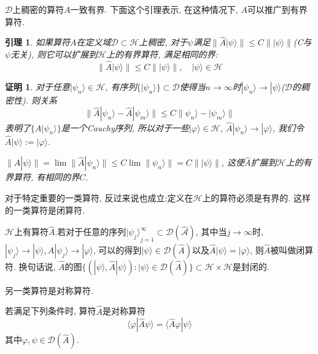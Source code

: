 \documentclass[a4paper,11pt]{article}
\theoremstyle{mystyle}
\newtheorem{lemma}{\hspace{2em}引理}[section]
\newtheorem{Proof}{\hspace{2em}证明}[section]
\begin{document}
$\mathcal{D}$上稠密的算符$A$一致有界. 下面这个引理表示, 在这种情况下, $A$可以推广到有界算符.
\begin{lemma}
  如果算符$A$在定义域$\mathcal{D}\subset\mathcal{H}$上稠密, 对于$\psi$满足$\|\hat{A}|\psi\rangle\|\leq C\||\psi\rangle\|$(C与$\psi$无关), 则它可以扩展到$\mathcal{H}$上的有界算符, 满足相同的界:
\begin{equation*}
  \|\hat{A}|\psi\rangle\|\leq C\||\psi\rangle\|,\quad|\psi\rangle\in\mathcal{H}
\end{equation*}
\end{lemma}
\begin{Proof}
  对于任意$|\psi_n\rangle\in\mathcal{H}$, 有序列$\{|\psi_n\rangle\}\subset \mathcal{D}$使得当$n\to\infty$时$|\psi_n\rangle\to|\psi\rangle$($\mathcal{D}$的稠密性). 则关系
\begin{equation*}
  \|\hat{A}|\psi_n\rangle-\hat{A}|\psi_m\rangle\|\leq C\|\psi_n\rangle-|\psi_m\rangle\|
\end{equation*}
表明了$\{A|\psi_n\rangle\}$是一个Cauchy序列, 所以对于一些$|\varphi\rangle\in\mathcal{H}$, $\hat{A}|\psi_n\rangle\to|\varphi\rangle$, 我们令$\hat{A}|\psi\rangle:=|\varphi\rangle$.

$\|\hat{A}|\psi\rangle\|=\lim\|\hat{A}|\psi_n\rangle\|\leq C\lim\|\psi_n\rangle\|=C\||\psi\rangle\|$, 这使$\hat{A}$扩展到$\mathcal{H}$上的有界算符, 有相同的界$C$.
\end{Proof}
对于特定重要的一类算符, 反过来说也成立:定义在$\mathcal{H}$上的算符必须是有界的. 这样的一类算符是闭算符.
\begin{definition}[有界算符]\label{Closed operator def}
  $\mathcal{H}$上有算符$\hat{A}$.若对于任意的序列${|\psi_j\rangle}_{j=1}^{\infty}\subset\mathcal{D(\hat{A})}$, 其中当$j\to\infty$时,$|\psi_j\rangle\to|\psi\rangle, A|\psi_j\rangle\to|\varphi\rangle$, 可以的得到$|\psi\rangle\in\mathcal{D}(\hat{A})$以及$\hat{A}|\psi\rangle=|\varphi\rangle$, 则$\hat{A}$被叫做闭算符. 换句话说, $\hat{A}$的图$\{(|\psi\rangle,\hat{A}|\psi\rangle):|\psi\rangle\in\mathcal{D}(\hat{A})\}\subset\mathcal{H}\times\mathcal{H}$是封闭的.
\end{definition}
另一类算符是对称算符.
\begin{definition}[对称算符]\label{Symmetric operator}
  若满足下列条件时, 算符$\hat{A}$是对称算符
\begin{equation*}
  \langle\varphi|\hat{A}\psi\rangle=\langle\hat{A}\varphi|\psi\rangle
\end{equation*}
其中$\varphi,\psi\in\mathcal{D}(\hat{A})$.
\end{definition}
\end{document}
